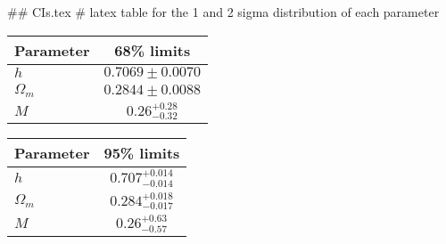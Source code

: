 ## CIs.tex
# latex table for the 1 and 2 sigma distribution of each parameter

\begin{tabular} { l  c}
 Parameter &  68\% limits\\
\hline
{\boldmath$h              $} & $0.7069\pm 0.0070          $\\
{\boldmath$\Omega_m       $} & $0.2844\pm 0.0088          $\\
{\boldmath$M              $} & $0.26^{+0.28}_{-0.32}      $\\
\hline
\end{tabular}

\begin{tabular} { l  c}
 Parameter &  95\% limits\\
\hline
{\boldmath$h              $} & $0.707^{+0.014}_{-0.014}   $\\
{\boldmath$\Omega_m       $} & $0.284^{+0.018}_{-0.017}   $\\
{\boldmath$M              $} & $0.26^{+0.63}_{-0.57}      $\\
\hline
\end{tabular}
